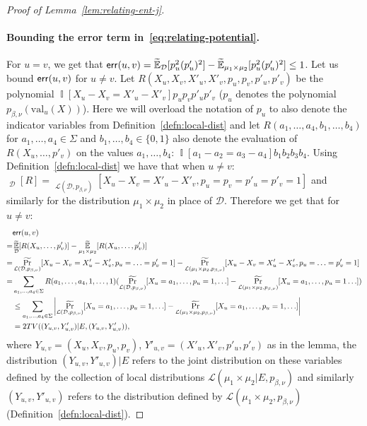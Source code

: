 \documentclass[11pt]{article}
\DeclareMathOperator*{\pE}{\widetilde{\mathbb{E}}}
\DeclareMathOperator*{\pPr}{\widetilde{\Pr}}
\DeclareMathOperator*{\Ind}{\mathbb{I}}
\def \cD {\mathcal{D}}
\def \cL {\mathcal{L}}
\def \val {\mathrm{val}}
\theoremstyle{definition}
\begin{document}
\begin{proof}[Proof of Lemma~\ref{lem:relating-ent-j}]
\paragraph{Bounding the error term in~\eqref{eq:relating-potential}.} 
For $u = v$, we get that ${\sf err}(u,v) = \pE_{\cD}[p_u^2 (p'_u)^2] - \pE_{\mu_1 \times \mu_2}[p_u^2 (p'_u)^2] \leq 1$. Let us bound ${\sf err}(u,v)$ for $u \neq v$.
Let $R(X_u,X_v,X'_u,X'_v,p_{u},p_{v}, p'_u,p'_v)$ be the polynomial $\Ind[X_u - X_v = X'_u- X'_v]p_u p_v p'_u p'_v$ ($p_u$ denotes the polynomial $p_{\beta,\nu}(\val_u(X))$). Here we will overload the notation of $p_u$ to also denote the indicator variables from Definition~\ref{defn:local-dist} and let $R(a_1,\ldots,a_4,b_1,\ldots,b_4)$ for $a_1,\ldots,a_4 \in \Sigma$ and $b_1,\ldots,b_4 \in \{0,1\}$ also denote the evaluation of $R(X_u,\ldots,p'_v)$ on the values $a_1,\ldots,b_4$: $\Ind[a_1 - a_2 = a_3- a_4]b_1 b_2b_3 b_4$. Using Definition~\ref{defn:local-dist} we have that when $u \neq v$: $\pE_{\cD}[R] = \pPr_{\cL(\cD,p_{\beta,\nu})}[X_u - X_v = X'_u - X'_v, p_u = p_v = p'_u = p'_v = 1]$ and similarly for the distribution $\mu_1 \times \mu_2$ in place of $\cD$. Therefore we get that for $u \neq v$: 
\begin{align*}
&{\sf err}(u,v)\\
=&\pE_{\cD}[R(X_u,\ldots,p'_v)] - \pE_{\mu_1 \times \mu_2}[R(X_u,\ldots,p'_v)] \\
=&\pPr_{\cL(\cD,p_{\beta,\nu})}[X_u - X_v = X'_u - X'_v, p_u = \ldots =p'_v = 1] - \pPr_{\cL(\mu_1 \times \mu_2,p_{\beta,\nu})}[X_u - X_v = X'_u - X'_v, p_u = \ldots = p'_v = 1]\\
=&\sum_{\substack{a_1,\ldots,a_4 \in \Sigma}}  R(a_1,\ldots,a_4, 1,\ldots,1)(\pPr_{\cL(\cD,p_{\beta,\nu})}[X_u = a_1,\ldots,p_u =1, \ldots] - \pPr_{\cL(\mu_1 \times \mu_2,p_{\beta,\nu})}[X_u = a_1,\ldots,p_u =1 \ldots])\\
&\leq \sum_{\substack{a_1,\ldots,a_4 \in \Sigma}} \left|\pPr_{\cL(\cD,p_{\beta,\nu})}[X_u = a_1,\ldots,p_u = 1,\ldots] - \pPr_{\cL(\mu_1 \times \mu_2,p_{\beta,\nu})}[X_u = a_1,\ldots,p_u = 1,\ldots] \right| \\
&= 2 TV((Y_{u,v},Y'_{u,v})|E , (Y_{u,v},Y'_{u,v})),
\end{align*}
where $Y_{u,v} = (X_u,X_v,p_u,p_v)$, $Y'_{u,v} = (X'_u,X'_v,p'_u,p'_v)$ as in the lemma, the distribution $(Y_{u,v},Y'_{u,v})|E$ refers to the joint distribution on these variables defined by the collection of local distributions $\cL(\mu_1 \times \mu_2|E, p_{\beta,\nu})$ and similarly $(Y_{u,v},Y'_{u,v})$ refers to the distribution defined by $\cL(\mu_1 \times \mu_2,p_{\beta,\nu})$ (Definition~\ref{defn:local-dist}). 


\end{proof}
\end{document}
